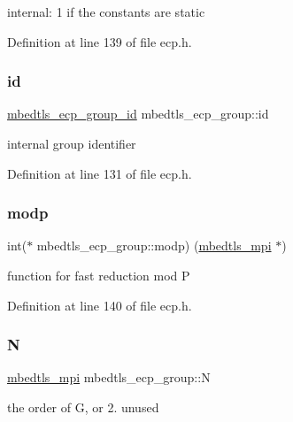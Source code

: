internal\+: 1 if the constants are static 

Definition at line 139 of file ecp.\+h.

\mbox{\label{structmbedtls__ecp__group_a3e572cd2e40e1c23fc9a7a6aef7122d6}} 
\subsubsection{\texorpdfstring{id}{id}}
{\footnotesize\ttfamily \mbox{\hyperlink{ecp_8h_af79e530ea8f8416480f805baa20b1a2d}{mbedtls\+\_\+ecp\+\_\+group\+\_\+id}} mbedtls\+\_\+ecp\+\_\+group\+::id}

internal group identifier 

Definition at line 131 of file ecp.\+h.

\mbox{\label{structmbedtls__ecp__group_ad828ec2b9dcccb7664744fa5b69f561f}} 
\subsubsection{\texorpdfstring{modp}{modp}}
{\footnotesize\ttfamily int($\ast$ mbedtls\+\_\+ecp\+\_\+group\+::modp) (\mbox{\hyperlink{structmbedtls__mpi}{mbedtls\+\_\+mpi}} $\ast$)}

function for fast reduction mod P 

Definition at line 140 of file ecp.\+h.

\mbox{\label{structmbedtls__ecp__group_a7104724a939b7eef2ae3627db410e1e8}} 
\subsubsection{\texorpdfstring{N}{N}}
{\footnotesize\ttfamily \mbox{\hyperlink{structmbedtls__mpi}{mbedtls\+\_\+mpi}} mbedtls\+\_\+ecp\+\_\+group\+::N}


\begin{DoxyEnumerate}
\item the order of G, or 2. unused 
\end{DoxyEnumerate}

